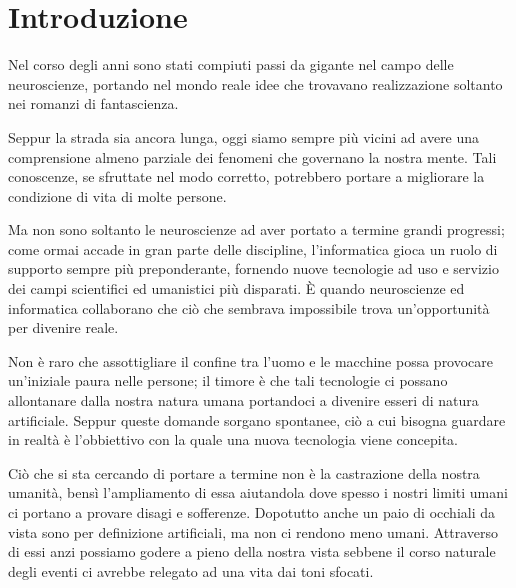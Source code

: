 \chapter*{Introduzione}
Nel corso degli anni sono stati compiuti passi da gigante nel campo delle neuroscienze, portando nel mondo reale idee che trovavano realizzazione soltanto nei romanzi di fantascienza.\newline

\noindent Seppur la strada sia ancora lunga, oggi siamo sempre più vicini ad avere una comprensione almeno parziale dei fenomeni che governano la nostra mente.\newline
Tali conoscenze, se sfruttate nel modo corretto, potrebbero portare a migliorare la condizione di vita di molte persone. \newline

\noindent Ma non sono soltanto le neuroscienze ad aver portato a termine grandi progressi; come ormai accade in gran parte delle discipline, l'informatica gioca un ruolo di supporto sempre più preponderante, fornendo nuove tecnologie ad uso e servizio dei campi scientifici ed umanistici più disparati.\newline
È quando neuroscienze ed informatica collaborano che ciò che sembrava impossibile trova un'opportunità per divenire reale.\newline

\noindent Non è raro che assottigliare il confine tra l'uomo e le macchine possa provocare un'iniziale paura nelle persone; il timore è che tali tecnologie ci possano allontanare dalla nostra natura umana portandoci a divenire esseri di natura artificiale.\newline
Seppur queste domande sorgano spontanee, ciò a cui bisogna guardare in realtà è l'obbiettivo con la quale una nuova tecnologia viene concepita.\newline

\noindent Ciò che si sta cercando di portare a termine non è la castrazione della nostra umanità, bensì l'ampliamento di essa aiutandola dove spesso i nostri limiti umani ci portano a provare disagi e sofferenze.\newline
Dopotutto anche un paio di occhiali da vista sono per definizione artificiali, ma non ci rendono meno umani.\newline
Attraverso di essi anzi possiamo godere a pieno della nostra vista sebbene il corso naturale degli eventi ci avrebbe relegato ad una vita dai toni sfocati.\newline

